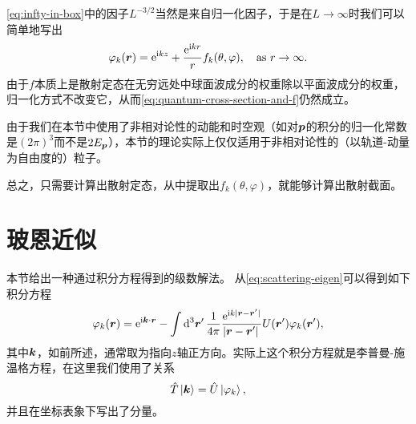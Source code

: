 \eqref{eq:infty-in-box}中的因子$L^{-3/2}$当然是来自归一化因子，于是在$L \to \infty$时我们可以简单地写出
\begin{equation}
    \varphi_k(\vb*{r}) = \mathrm{e}^{\mathrm{i} k z} + \frac{\mathrm{e}^{\mathrm{i} k r}}{r} f_k(\theta, \varphi) , \quad \text{as $r \to \infty$}.
    \label{eq:wave-function-k-f}
\end{equation}
由于$f$本质上是散射定态在无穷远处中球面波成分的权重除以平面波成分的权重，归一化方式不改变它，从而\eqref{eq:quantum-cross-section-and-f}仍然成立。

由于我们在本节中使用了非相对论性的动能和时空观（如对$\vb*{p}$的积分的归一化常数是$(2\pi)^3$而不是$2E_{\vb*{p}}$），本节的理论实际上仅仅适用于非相对论性的（以轨道-动量为自由度的）粒子。

总之，只需要计算出散射定态，从中提取出$f_k(\theta, \varphi)$，就能够计算出散射截面。

\section{玻恩近似}

本节给出一种通过积分方程得到的级数解法。
从\eqref{eq:scattering-eigen}可以得到如下积分方程
\begin{equation}
    \varphi_k(\vb*{r}) = \mathrm{e}^{\mathrm{i} \vb*{k} \cdot \vb*{r}} - \int \dd[3]{\vb*{r}'} \frac{1}{4\pi} \frac{\mathrm{e}^{\mathrm{i} k \abs*{\vb*{r} - \vb*{r}'}}}{\abs*{\vb*{r} - \vb*{r}'}} U(\vb*{r}') \varphi_k(\vb*{r}'),
    \label{eq:born-eq}
\end{equation}
其中$\vb*{k}$，如前所述，通常取为指向$z$轴正方向。实际上这个积分方程就是李普曼-施温格方程，在这里我们使用了关系
\[
    \hat{T} \ket*{\vb*{k}} = \hat{U} \ket*{\varphi_k},
\]
并且在坐标表象下写出了分量。

